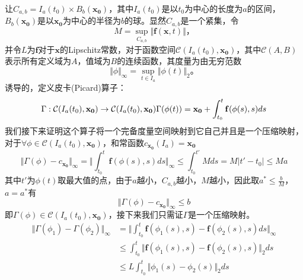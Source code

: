 \begin{pf}
    让$C_{a,b}=I_a(t_0)\times B_b(\mathbf{x_0})$，其中$I_a(t_0)$是以$t_0$为中心的长度为$a$的区间，$B_b(\mathbf{x_0})$是以$\mathbf{x_0}$为中心的半径为$b$的球。显然$C_{a,b}$是一个紧集，令
    \begin{equation}
        M=\sup_{C_{a,b}}\Vert \mathbf{f}(\mathbf{x},t)\Vert，
    \end{equation}
    并令$L$为$\mathbf{f}$对于$\mathbf{x}$的Lipschitz常数，对于函数空间$\mathcal{C}(I_a(t_0),\mathbf{x_0})$，其中$\mathcal{C}(A,B)$表示所有定义域为$A$，值域为$B$的连续函数，其度量为由无穷范数
    \begin{equation*}
        \Vert\phi\Vert_{\infty}=\sup_{t\in I_a}\Vert\phi(t)\Vert_2。
    \end{equation*}
    诱导的，定义皮卡(Picard)算子：
    \begin{equation*}
        \Gamma:\mathcal{C}(I_a(t_0),\mathbf{x_0})\to \mathcal{C}(I_a(t_0),\mathbf{x_0})\\
        \Gamma(\phi(t))=\mathbf{x_0}+\int_{t_0}^t\mathbf{f}(\phi(s),s)ds
    \end{equation*}
    我们接下来证明这个算子将一个完备度量空间映射到它自己并且是一个压缩映射，对于$\forall \phi\in\mathcal{C}(I_a(t_0),\mathbf{x_0})$，和常函数$c_{\mathbf{x_0}}(I_a)=\mathbf{x_0}$
    \begin{equation*}
        \Vert \Gamma(\phi)-c_{\mathbf{x_0}}\Vert_{\infty}=\Vert\int_{t_0}^t\mathbf{f}(\phi(s),s)ds\Vert_{\infty}\leq \int_{t_0}^{t'}Mds =M|t'-t_0|\leq Ma
    \end{equation*}
    其中$t'$为$\phi(t)$取最大值的点，由于$a$越小，$C_{a,b}$越小，$M$越小，因此取$a^*\leq \frac{b}{M}$，$a=a^*$有
    \begin{equation*}
        \Vert \Gamma(\phi)-c_{\mathbf{x_0}}\Vert_{\infty}\leq b
    \end{equation*}
    即$\Gamma(\phi)\in\mathcal{C}(I_a(t_0),\mathbf{x_0})$，接下来我们只需证$\Gamma$是一个压缩映射。
    \begin{equation*}
        \begin{aligned}
            \Vert\Gamma(\phi_1)-\Gamma(\phi_2)\Vert_{\infty} & =\Vert \int_{t_0}^t\mathbf{f}(\phi_1(s),s)-\mathbf{f}(\phi_2(s),s)ds\Vert_{\infty} \\
                                                             & \leq\int_{t_0}^t\Vert\mathbf{f}(\phi_1(s),s)-\mathbf{f}(\phi_2(s),s)\Vert_2 ds     \\
                                                             & \leq L\int_{t_0}^t\Vert \phi_1(s)-\phi_2(s)\Vert_2 ds                              \\

\end{aligned}
\end{equation*}
\end{pf}
